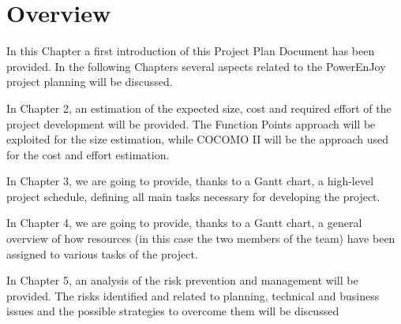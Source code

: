 \section{Overview}
In this Chapter a first introduction of this Project Plan Document has been provided. In the following Chapters several aspects related to the PowerEnJoy project planning will be discussed.

In Chapter 2, an estimation of the expected size, cost and required effort of the project development will be provided. The Function Points approach will be exploited for the size estimation, while COCOMO II will be the approach used for the cost and effort estimation.

In Chapter 3, we are going to provide, thanks to a Gantt chart, a high-level project schedule, defining all main tasks necessary for developing the project.

In Chapter 4, we are going to provide, thanks to a Gantt chart, a general overview of how resources (in this case the two members of the team) have been assigned to various tasks of the project.

In Chapter 5, an analysis of the risk prevention and management will be provided. The risks identified and related to planning, technical and business issues and the possible strategies to overcome them will be discussed 
